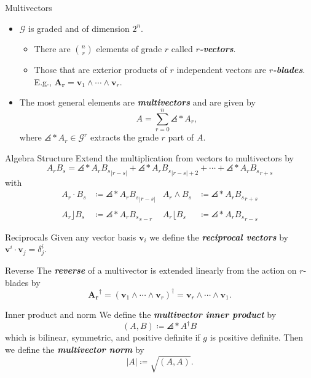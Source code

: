 \documentclass[aspectratio=169,handout]{beamer}
\newcommand\boldgreen[1]{\textcolor{lighter_csu_green}{\emph{\textbf{#1}}}}
\newcommand{\G}{\mathcal{G}}
\newcommand{\blade}[1]{\boldsymbol{#1}}
\DeclarePairedDelimiter\angles{\langle}{\rangle}
\newcommand{\proj}[2]{\angles*{#2}_{#1}}
\begin{document}
\begin{frame}{Multivectors}
\vfill
\begin{itemize}
    \pause
        \item $\G$ is graded and of dimension $2^n$.
    \begin{itemize}
    \pause
        \item There are ${n \choose r}$ elements of grade $r$ called \boldgreen{$r$-vectors}. 
        \item Those that are exterior products of $r$ independent vectors are \boldgreen{$r$-blades}. E.g., $\blade{A_r}=\blade{v}_1 \wedge \cdots \wedge\blade{v}_r$.
    \end{itemize}
    \pause
        \item The most general elements are \boldgreen{multivectors} and are given by
        \[
        A = \sum_{r=0}^n \proj{r}{A},
        \]
        where $\proj{r}{A}\in \G^r$ extracts the grade $r$ part of $A$.
\end{itemize}
\vfill
\end{frame}

\begin{frame}{Algebra Structure}
\vfill
Extend the multiplication from vectors to multivectors by
\[
A_r B_s = \proj{|r-s|}{A_r B_s} + \proj{|r-s|+2}{A_r B_s} + \cdots + \proj{r+s}{A_r B_s}
\]
with
\begin{align*}
A_r \cdot B_s &\coloneqq \proj{|r-s|}{A_r B_s}  & A_r \wedge B_s &\coloneqq \proj{r+s}{A_r B_s}\\
~\\
A_r \rfloor B_s &\coloneqq \proj{s-r}{A_r B_s}  & A_r \lfloor B_s &\coloneqq \proj{r-s}{A_r B_s}
\end{align*}
\vfill
\end{frame}

\begin{frame}{Reciprocals}
 Given any vector basis $\blade{v}_i$ we define the \boldgreen{reciprocal vectors} by $\blade{v}^i\cdot \blade{v}_j = \delta^i_j$.
\end{frame}

\begin{frame}{Reverse}
The \boldgreen{reverse} of a multivector is extended linearly from the action on $r$-blades by
\[
\blade{A_r}^\dagger = (\blade{v}_1 \wedge \cdots \wedge\blade{v}_r)^\dagger = \blade{v}_r \wedge \cdots \wedge\blade{v}_1.
\]
\end{frame}

\begin{frame}{Inner product and norm}
We define the \boldgreen{multivector inner product} by
\[
(A,B) \coloneqq \proj{}{A^\dagger B}
\]
which is bilinear, symmetric, and positive definite if $g$ is positive definite. Then we define the \boldgreen{multivector norm} by
\[
|A| \coloneqq \sqrt{(A,A)}.
\]
\end{frame}
\end{document}
